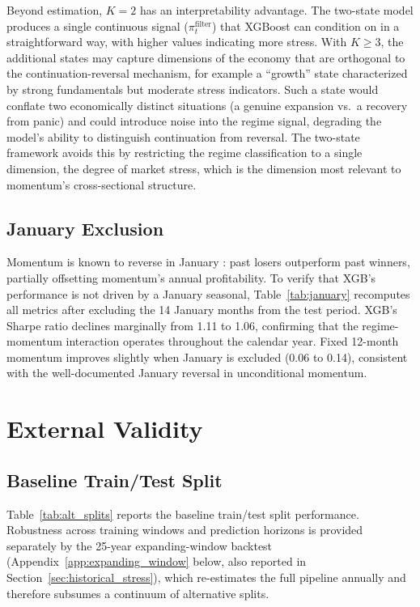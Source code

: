 Beyond estimation, $K = 2$ has an interpretability advantage. The two-state model produces a single continuous signal ($\pi_t^{\text{filter}}$) that XGBoost can condition on in a straightforward way, with higher values indicating more stress. With $K \geq 3$, the additional states may capture dimensions of the economy that are orthogonal to the continuation-reversal mechanism, for example a ``growth'' state characterized by strong fundamentals but moderate stress indicators. Such a state would conflate two economically distinct situations (a genuine expansion vs.\ a recovery from panic) and could introduce noise into the regime signal, degrading the model's ability to distinguish continuation from reversal. The two-state framework avoids this by restricting the regime classification to a single dimension, the degree of market stress, which is the dimension most relevant to momentum's cross-sectional structure.

\subsection{January Exclusion}\label{app:january}

Momentum is known to reverse in January \citep{JegadeeshTitman1993}: past losers outperform past winners, partially offsetting momentum's annual profitability. To verify that XGB's performance is not driven by a January seasonal, Table~\ref{tab:january} recomputes all metrics after excluding the 14 January months from the test period. XGB's Sharpe ratio declines marginally from 1.11 to 1.06, confirming that the regime-momentum interaction operates throughout the calendar year. Fixed 12-month momentum improves slightly when January is excluded (0.06 to 0.14), consistent with the well-documented January reversal in unconditional momentum.



\section{External Validity}\label{app:external_validity}

\subsection{Baseline Train/Test Split}\label{app:alt_splits}

Table~\ref{tab:alt_splits} reports the baseline train/test split performance. Robustness across training windows and prediction horizons is provided separately by the 25-year expanding-window backtest (Appendix~\ref{app:expanding_window} below, also reported in Section~\ref{sec:historical_stress}), which re-estimates the full pipeline annually and therefore subsumes a continuum of alternative splits.

